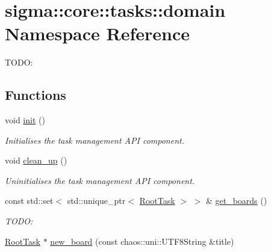 \hypertarget{namespacesigma_1_1core_1_1tasks_1_1domain}{}\section{sigma\+:\+:core\+:\+:tasks\+:\+:domain Namespace Reference}
\label{namespacesigma_1_1core_1_1tasks_1_1domain}


T\+O\+D\+O\+:  


\subsection*{Functions}
\begin{DoxyCompactItemize}
\item 
void \hyperlink{namespacesigma_1_1core_1_1tasks_1_1domain_a1c9e74f15ced5d6050449521f089d293}{init} ()
\begin{DoxyCompactList}\small\item\em Initialises the task management A\+P\+I component. \end{DoxyCompactList}\item 
void \hyperlink{namespacesigma_1_1core_1_1tasks_1_1domain_a5133e92ea740e153728af3fd8d872d36}{clean\+\_\+up} ()
\begin{DoxyCompactList}\small\item\em Uninitialises the task management A\+P\+I component. \end{DoxyCompactList}\item 
\hypertarget{namespacesigma_1_1core_1_1tasks_1_1domain_ae85ad90e7ee1bf783a0da97bb553f93a}{}const std\+::set$<$ std\+::unique\+\_\+ptr$<$ \hyperlink{classsigma_1_1core_1_1tasks_1_1_root_task}{Root\+Task} $>$ $>$ \& \hyperlink{namespacesigma_1_1core_1_1tasks_1_1domain_ae85ad90e7ee1bf783a0da97bb553f93a}{get\+\_\+boards} ()\label{namespacesigma_1_1core_1_1tasks_1_1domain_ae85ad90e7ee1bf783a0da97bb553f93a}

\begin{DoxyCompactList}\small\item\em T\+O\+D\+O\+: \end{DoxyCompactList}\item 
\hypertarget{namespacesigma_1_1core_1_1tasks_1_1domain_a876d28fa6539e8dbeea2e0a48ed1f460}{}\hyperlink{classsigma_1_1core_1_1tasks_1_1_root_task}{Root\+Task} $\ast$ \hyperlink{namespacesigma_1_1core_1_1tasks_1_1domain_a876d28fa6539e8dbeea2e0a48ed1f460}{new\+\_\+board} (const chaos\+::uni\+::\+U\+T\+F8\+String \&title)\label{namespacesigma_1_1core_1_1tasks_1_1domain_a876d28fa6539e8dbeea2e0a48ed1f460}


\end{DoxyCompactItemize}
